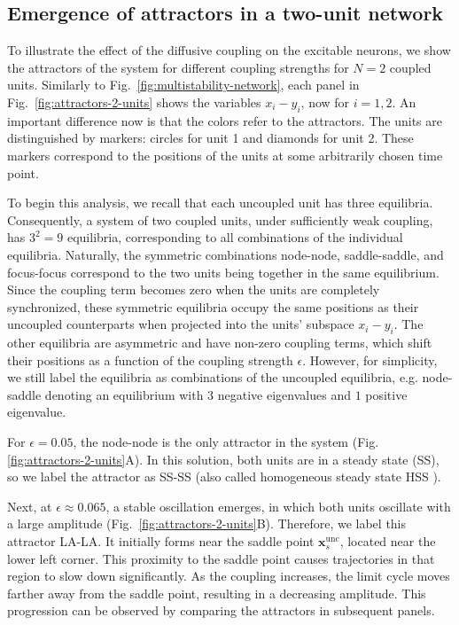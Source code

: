 \subsection{Emergence of attractors in a two-unit network} \label{sec:2units}
To illustrate the effect of the diffusive coupling on the excitable neurons, we show the attractors of the system for different coupling strengths for $N=2$ coupled units. Similarly to Fig.~\ref{fig:multistability-network}, each panel in Fig.~\ref{fig:attractors-2-units} shows the variables $x_i-y_i$, now for $i=1,2$. An important difference now is that the colors refer to the attractors. The units are distinguished by markers: circles for unit 1 and diamonds for unit 2. These markers correspond to the positions of the units at some arbitrarily chosen time point.

To begin this analysis, we recall that each uncoupled unit has three equilibria. Consequently, a system of two coupled units, under sufficiently weak coupling, has $3^2=9$ equilibria, corresponding to all combinations of the individual equilibria. Naturally, the symmetric combinations node-node, saddle-saddle, and focus-focus correspond to the two units being together in the same equilibrium. Since the coupling term becomes zero when the units are completely synchronized, these symmetric equilibria occupy the same positions as their uncoupled counterparts when projected into the units' subspace $x_i-y_i$. The other equilibria are asymmetric and have non-zero coupling terms, which shift their positions as a function of the coupling strength $\epsilon$. However, for simplicity, we still label the equilibria as combinations of the uncoupled equilibria, e.g. node-saddle denoting an equilibrium with $3$ negative eigenvalues and $1$ positive eigenvalue.

For $\epsilon = 0.05$, the node-node is the only attractor in the system (Fig. \ref{fig:attractors-2-units}A). In this solution, both units are in a steady state (SS), so we label the attractor as SS-SS (also called homogeneous steady state HSS \cite{ullner2008multistability}).

Next, at $\epsilon \approx 0.065$, a stable oscillation emerges, in which both units oscillate with a large amplitude (Fig.~\ref{fig:attractors-2-units}B). Therefore, we label this attractor LA-LA. It initially forms near the saddle point $\mathbf{x}_s^\mathrm{unc}$, located near the lower left corner. This proximity to the saddle point causes trajectories in that region to slow down significantly. As the coupling increases, the limit cycle moves farther away from the saddle point, resulting in a decreasing amplitude. This progression can be observed by comparing the attractors in subsequent panels.

